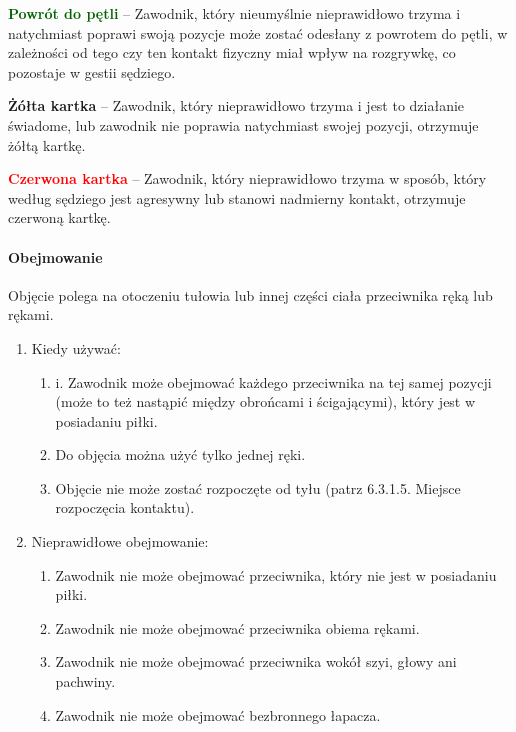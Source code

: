 \documentclass[12pt]{article}
\newcommand\redcard[1]{\bgroup\textcolor{red}{\textbf{#1}}}
\newcommand\yellowcard[1]{\bgroup\textcolor{darkyellow}{\textbf{#1}}}
\newcommand\other[1]{\bgroup\textcolor{darkgreen}{\textbf{#1}}}
\begin{document}
\other{Powrót do pętli} -- Zawodnik, który nieumyślnie nieprawidłowo
trzyma i natychmiast poprawi swoją pozycje może zostać odesłany z
powrotem do pętli, w zależności od tego czy ten kontakt fizyczny miał
wpływ na rozgrywkę, co pozostaje w gestii sędziego.

\yellowcard{Żółta kartka} -- Zawodnik, który nieprawidłowo trzyma i jest to
działanie świadome, lub zawodnik nie poprawia natychmiast swojej
pozycji, otrzymuje żółtą kartkę.

\redcard{Czerwona kartka} -- Zawodnik, który nieprawidłowo trzyma w sposób,
który według sędziego jest agresywny lub stanowi nadmierny kontakt,
otrzymuje czerwoną kartkę.

\paragraph{Obejmowanie}
Objęcie polega na otoczeniu tułowia lub
innej części ciała przeciwnika ręką lub rękami.

\begin{enumerate}
	\item
	      Kiedy używać:

	      \begin{enumerate}
		      \item
		            i. Zawodnik może obejmować każdego przeciwnika na tej samej pozycji
		            (może to też nastąpić między obrońcami i ścigającymi), który jest w
		            posiadaniu piłki.
		      \item
		            Do objęcia można użyć tylko jednej ręki.
		      \item
		            Objęcie nie może zostać rozpoczęte od tyłu (patrz 6.3.1.5. Miejsce
		            rozpoczęcia kontaktu).
	      \end{enumerate}
	\item
	      Nieprawidłowe obejmowanie:

	      \begin{enumerate}
		      \item Zawodnik nie może obejmować przeciwnika, który nie jest w posiadaniu
		            piłki.
		      \item
		            Zawodnik nie może obejmować przeciwnika obiema rękami.
		      \item
		            Zawodnik nie może obejmować przeciwnika wokół szyi, głowy ani
		            pachwiny.
		      \item
		            Zawodnik nie może obejmować bezbronnego łapacza.
	      \end{enumerate}
\end{enumerate}
\end{document}
